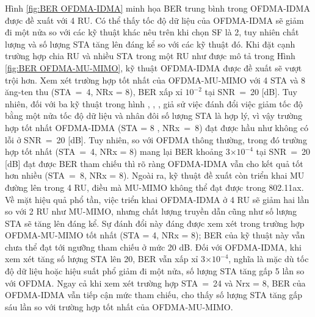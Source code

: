 Hình \ref{fig:BER OFDMA-IDMA} minh họa BER trung bình trong OFDMA-IDMA được đề xuất với 4 RU. Có thể thấy tốc độ dữ liệu của OFDMA-IDMA sẽ giảm đi một nửa so với các kỹ thuật khác nêu trên khi chọn SF là 2, tuy nhiên chất lượng và số lượng STA tăng lên đáng kể so với các kỹ thuật đó. Khi đặt cạnh trường hợp chia RU và nhiều STA trong một RU như được mô tả trong Hình \ref{fig:BER OFDMA-MU-MIMO}, kỹ thuật OFDMA-IDMA được đề xuất sẽ vượt trội hơn. Xem xét trường hợp tốt nhất của OFDMA-MU-MIMO với 4 STA và 8 ăng-ten thu (STA~=~4, NRx = 8), BER xấp xỉ $10^{-2}$ tại SNR~=~20 [dB]. Tuy nhiên, đối với ba kỹ thuật trong hình , , , giả sử việc đánh đổi việc giảm tốc độ bằng một nửa tốc độ dữ liệu và nhân đôi số lượng STA là hợp lý, vì vậy trường hợp tốt nhất OFDMA-IDMA (STA = 8 , NRx~=~8) đạt được hầu như không có lỗi ở SNR~=~20 [dB]. Tuy nhiên, so với OFDMA thông thường, trong đó trường hợp tốt nhất (STA~=~4, NRx = 8) mang lại BER khoảng $3\mathord{\times}10^{-4}$ tại SNR~=~20 [dB] đạt được BER tham chiếu thì rõ ràng OFDMA-IDMA vẫn cho kết quả tốt hơn nhiều (STA~=~8, NRx = 8).
Ngoài ra, kỹ thuật đề xuất còn triển khai MU đường lên trong 4 RU, điều mà MU-MIMO không thể đạt được trong 802.11ax. Về mặt hiệu quả phổ tần, việc triển khai OFDMA-IDMA ở 4 RU sẽ giảm hai lần so với 2 RU như MU-MIMO, nhưng chất lượng truyền dẫn cũng như số lượng STA sẽ tăng lên đáng kể.
Sự đánh đổi này đáng được xem xét trong trường hợp OFDMA-MU-MIMO tốt nhất (STA = 4, NRx = 8); BER của kỹ thuật này vẫn chưa thể đạt tới ngưỡng tham chiếu ở mức 20 dB. Đối với OFDMA-IDMA, khi xem xét tăng số lượng STA lên 20, BER vẫn xấp xỉ $3\mathord{\times}10^{-4}$, nghĩa là mặc dù tốc độ dữ liệu hoặc hiệu suất phổ giảm đi một nửa, số lượng STA tăng gấp 5 lần so với OFDMA. Ngay cả khi xem xét trường hợp STA~=~24 và Nrx = 8, BER của OFDMA-IDMA vẫn tiếp cận mức tham chiếu, cho thấy số lượng STA tăng gấp sáu lần so với trường hợp tốt nhất của OFDMA-MU-MIMO.


